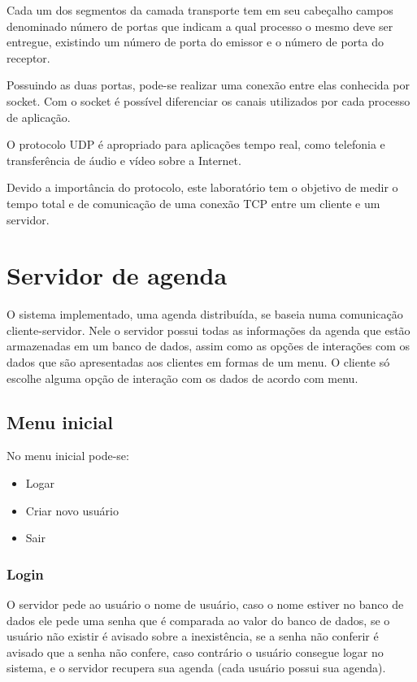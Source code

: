 \documentclass[10pt,a4paper]{article}
\begin{document}
Cada um dos segmentos da camada transporte tem em seu cabeçalho campos
denominado número de portas que indicam a qual processo o mesmo deve
ser entregue, existindo um número de porta do emissor e o número de porta do
receptor. 

Possuindo as duas portas, pode-se realizar uma conexão entre elas
conhecida por socket. Com o socket é possível diferenciar os canais
utilizados por cada processo de aplicação.

O protocolo UDP é apropriado para aplicações
tempo real, como telefonia e transferência de áudio e
vídeo sobre a Internet.

Devido a importância do protocolo, este laboratório tem o objetivo de
medir o tempo total e de comunicação de uma conexão TCP entre um
cliente e um servidor.

\section{Servidor de agenda}
O sistema implementado, uma agenda distribuída, se baseia numa comunicação
cliente-servidor. Nele o servidor possui todas as informações da
agenda que estão armazenadas em um banco de dados,
assim como as opções de interações com os dados que são apresentadas
aos clientes em formas de um menu.
O cliente só escolhe alguma opção de interação com os dados de
acordo com menu.


\subsection{Menu inicial}
No menu inicial pode-se:

\begin{itemize}
\item Logar
\item Criar novo usuário
\item Sair
\end{itemize}

\subsubsection{Login}
O servidor pede ao usuário o nome de usuário, caso o nome estiver no
banco de dados ele pede uma senha que é comparada ao valor do banco de
dados, se o usuário não existir é avisado sobre a inexistência, se a
senha não conferir é avisado que a senha não confere, caso contrário o
usuário consegue logar no sistema, e o servidor recupera sua agenda (cada
usuário possui sua agenda).
\end{document}
